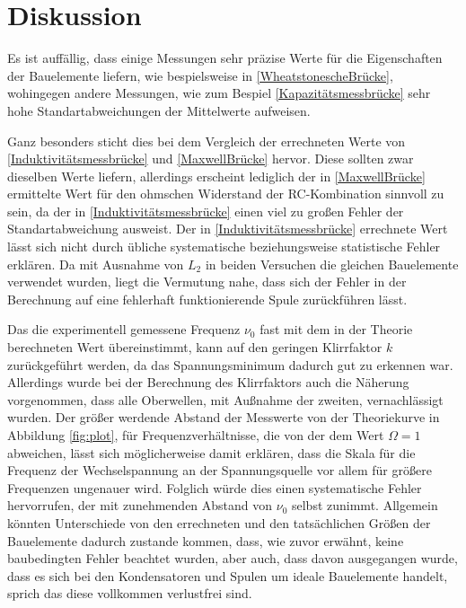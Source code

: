 \section{Diskussion}
\label{sec:Diskussion}

Es ist auffällig, dass einige Messungen sehr präzise Werte für die Eigenschaften der Bauelemente liefern, wie 
bespielsweise in \ref{WheatstonescheBrücke}, wohingegen andere Messungen, wie zum Bespiel \ref{Kapazitätsmessbrücke} sehr 
hohe Standartabweichungen der Mittelwerte aufweisen.

Ganz besonders sticht dies bei dem Vergleich der errechneten Werte von \ref{Induktivitätsmessbrücke} und \ref{MaxwellBrücke} hervor.
Diese sollten zwar dieselben Werte liefern, allerdings erscheint lediglich der in \ref{MaxwellBrücke} ermittelte Wert für den 
ohmschen Widerstand der RC-Kombination sinnvoll zu sein, da der in \ref{Induktivitätsmessbrücke} einen viel zu großen Fehler der 
Standartabweichung ausweist. Der in \ref{Induktivitätsmessbrücke} errechnete Wert lässt sich nicht durch übliche systematische beziehungsweise
statistische Fehler erklären. Da mit Ausnahme von $L_{2}$ in beiden Versuchen die gleichen Bauelemente verwendet wurden, liegt 
die Vermutung nahe, dass sich der Fehler in der Berechnung auf eine fehlerhaft funktionierende Spule zurückführen lässt.

Das die experimentell gemessene Frequenz $\nu_{0}$ fast mit dem in der Theorie berechneten Wert übereinstimmt, kann auf den 
geringen Klirrfaktor $k$ zurückgeführt werden, da das Spannungsminimum dadurch gut zu erkennen war. Allerdings wurde bei der Berechnung
des Klirrfaktors auch die Näherung vorgenommen, dass alle Oberwellen, mit Außnahme der zweiten, vernachlässigt wurden.
Der größer werdende Abstand der Messwerte  von der Theoriekurve in Abbildung \ref{fig:plot}, 
für Frequenzverhältnisse, die von der dem Wert $\Omega = 1$ abweichen, lässt sich möglicherweise damit erklären, dass die Skala für 
die Frequenz der Wechselspannung an der Spannungsquelle vor allem für größere Frequenzen ungenauer wird. Folglich würde dies einen 
systematische Fehler hervorrufen, der mit zunehmenden Abstand von $\nu_{0}$ selbst zunimmt.
Allgemein könnten Unterschiede von den errechneten und den tatsächlichen Größen der Bauelemente dadurch zustande kommen, dass, wie zuvor erwähnt,
keine baubedingten Fehler beachtet wurden, aber auch, dass davon ausgegangen wurde, dass es sich bei den Kondensatoren und Spulen um ideale 
Bauelemente handelt, sprich das diese vollkommen verlustfrei sind.
